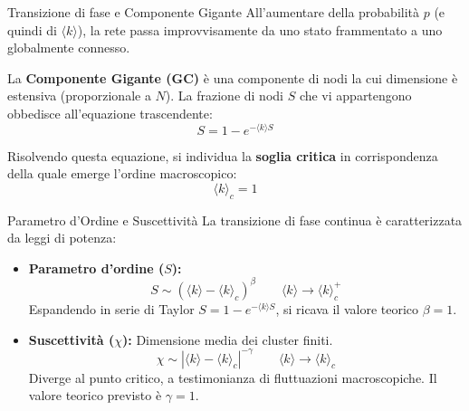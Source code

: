 \documentclass[italian]{beamer}
\begin{document}
\begin{frame}{Transizione di fase e Componente Gigante}
    All'aumentare della probabilità $p$ (e quindi di $\langle k \rangle$), la rete passa improvvisamente da uno stato frammentato a uno globalmente connesso.

    \vspace{0.3cm}
    La \textbf{Componente Gigante (GC)} è una componente di nodi la cui dimensione è estensiva (proporzionale a $N$). La frazione di nodi $S$ che vi appartengono obbedisce all'equazione trascendente:
    \begin{equation*}
        S = 1 - e^{-\langle k \rangle S}
    \end{equation*}

    \vspace{0.3cm}
    Risolvendo questa equazione, si individua la \textbf{soglia critica} in corrispondenza della quale emerge l'ordine macroscopico:
    \begin{equation*}
        \langle k \rangle_c = 1
    \end{equation*}
\end{frame}

\begin{frame}{Parametro d'Ordine e Suscettività}
    La transizione di fase continua è caratterizzata da leggi di potenza:

    \begin{itemize}
        \item \textbf{Parametro d'ordine ($S$):}
              \begin{equation*}
                  S \sim (\langle k \rangle - \langle k \rangle_c)^\beta \quad\quad \langle k \rangle \to \langle k \rangle_c^+
              \end{equation*}
              Espandendo in serie di Taylor $S = 1 - e^{-\langle k \rangle S}$, si ricava il valore teorico $\beta = 1$.

        \item \textbf{Suscettività ($\chi$):} Dimensione media dei cluster finiti.
              \begin{equation*}
                  \chi \sim |\langle k \rangle - \langle k \rangle_c|^{-\gamma} \quad\quad \langle k \rangle \to \langle k \rangle_c
              \end{equation*}
              Diverge al punto critico, a testimonianza di fluttuazioni macroscopiche. Il valore teorico previsto è $\gamma = 1$.
    \end{itemize}
\end{frame}
\end{document}
